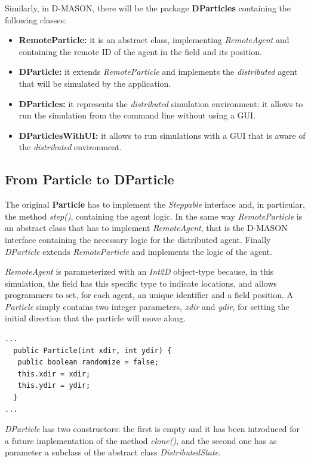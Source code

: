 \documentclass[12pt]{article}
\begin{document}
Similarly, in D-MASON, there will be the package \textbf{DParticles} containing the following classes:
\begin{itemize}
	\item \textbf{RemoteParticle:} it is an abstract class, implementing \textit{RemoteAgent} and containing the remote ID of the agent in the field and its position. 
	\item \textbf{DParticle:} it extends \textit{RemoteParticle} and implements the \textit{distributed} agent that will be simulated by the application.
	\item \textbf{DParticles:} it represents the \textit{distributed} simulation environment: it allows to run the simulation from the command line without using a GUI.
	\item \textbf{DParticlesWithUI:} it allows to run simulations with a GUI that is aware of the \textit{distributed} environment.
\end{itemize}

\subsection{From Particle to DParticle}
The original \textbf{Particle} has to implement the \textit{Steppable} interface and, in particular, the method \textit{step()}, containing the agent logic. In the same way \textit{RemoteParticle} is an abstract class that has to implement \textit{RemoteAgent}, that is the D-MASON interface containing the necessary logic for the distributed agent. Finally \textit{DParticle} extends \textit{RemoteParticle} and implements the logic of the agent.

\textit{RemoteAgent} is parameterized with an \textit{Int2D} object-type because, in this simulation, the field has this specific type to indicate locations, and allows programmers to set, for each agent, an unique identifier and a field position.
A \textit{Particle} simply contains two integer parameters, \textit{xdir} and \textit{ydir}, for setting the initial direction that the particle will move along.

\begin{lstlisting}
...
  public Particle(int xdir, int ydir) {
   public boolean randomize = false;
   this.xdir = xdir;
   this.ydir = ydir;
  }
...
\end{lstlisting}
\medskip

\textit{DParticle} has two constructors: the first is empty and it has been introduced for a future implementation of the method \textit{clone()}, and the second one has as parameter a subclass of the abstract class \textit{DistributedState}.
\end{document}
